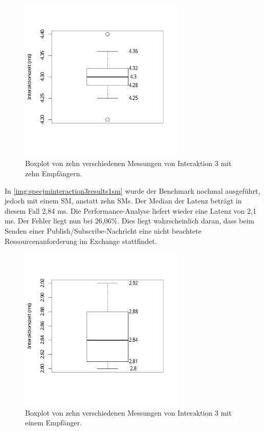 \begin{figure}[t]
\center
  \includegraphics[width=0.7\textwidth]{images/evaluation/specjmsresults/interaktion3-10SM.pdf}
  \caption{Boxplot von zehn verschiedenen Messungen von Interaktion 3 mit zehn Empfängern.}
  \label{img:specjminteraction3results10sm}
\end{figure}

In \autoref{img:specjminteraction3results1sm} wurde der Benchmark nochmal ausgeführt, jedoch mit einem SM, anstatt zehn SMs. Der Median der Latenz beträgt in diesem Fall 2,84 ms. Die Performance-Analyse liefert wieder eine Latenz von 2,1 ms. Der Fehler liegt nun bei 26,06\%. Dies liegt wahrscheinlich daran, dass beim Senden einer Publish/Subscribe-Nachricht eine nicht beachtete Ressourcenanforderung im Exchange stattfindet.
\begin{figure}
\center
  \includegraphics[width=0.7\textwidth]{images/evaluation/specjmsresults/interaktion3-1SM.pdf}
  \caption{Boxplot von zehn verschiedenen Messungen von Interaktion 3 mit einem Empfänger.}
  \label{img:specjminteraction3results1sm}
\end{figure}


